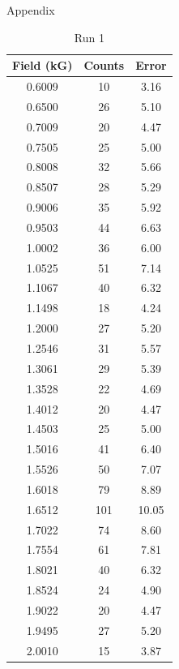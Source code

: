 \newpage \LARGE{Appendix}
\begin{table}[h!]
\caption{Run 1}
\begin{tabular}{|c|c|c|} \hline
Field	(kG)&	Counts	&	Error	\\	\hline
0.6009	&	10	&	3.16	\\	\hline
0.6500	&	26	&	5.10	\\	\hline
0.7009	&	20	&	4.47	\\	\hline
0.7505	&	25	&	5.00	\\	\hline
0.8008	&	32	&	5.66	\\	\hline
0.8507	&	28	&	5.29	\\	\hline
0.9006	&	35	&	5.92	\\	\hline
0.9503	&	44	&	6.63	\\	\hline
1.0002	&	36	&	6.00	\\	\hline
1.0525	&	51	&	7.14	\\	\hline
1.1067	&	40	&	6.32	\\	\hline
1.1498	&	18	&	4.24	\\	\hline
1.2000	&	27	&	5.20	\\	\hline
1.2546	&	31	&	5.57	\\	\hline
1.3061	&	29	&	5.39	\\	\hline
1.3528	&	22	&	4.69	\\	\hline
1.4012	&	20	&	4.47	\\	\hline
1.4503	&	25	&	5.00	\\	\hline
1.5016	&	41	&	6.40	\\	\hline
1.5526	&	50	&	7.07	\\	\hline
1.6018	&	79	&	8.89	\\	\hline
1.6512	&	101	&	10.05	\\	\hline
1.7022	&	74	&	8.60	\\	\hline
1.7554	&	61	&	7.81	\\	\hline
1.8021	&	40	&	6.32	\\	\hline
1.8524	&	24	&	4.90	\\	\hline
1.9022	&	20	&	4.47	\\	\hline
1.9495	&	27	&	5.20	\\	\hline
2.0010	&	15	&	3.87	\\	\hline
\end{tabular}
\end{table}
